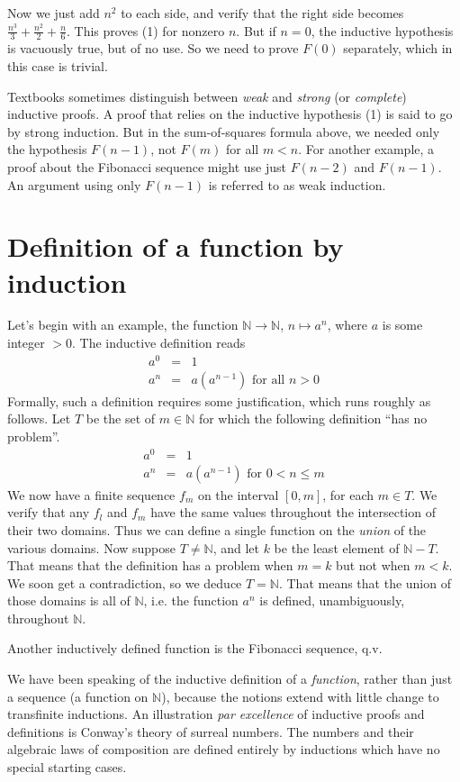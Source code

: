 \documentclass[12pt]{article}
\begin{document}
Now we just add $n^2$ to each side, and verify that the right side becomes
$\frac{n^3}{3} + \frac{n^2}{2} + \frac{n}{6}$.
This proves (1) for nonzero $n$.
But if $n=0$, the inductive hypothesis is vacuously true, but of no use.
So we need to prove $F(0)$ separately, which in this case is trivial.

Textbooks sometimes distinguish between \emph{weak} and
\emph{strong} (or \emph{complete}) inductive proofs.
A proof that relies on the inductive hypothesis (1) is said to go
by strong induction. But in the sum-of-squares formula above,
we needed only the hypothesis $F(n-1)$, not $F(m)$ for all $m<n$.
For another example, a proof about the Fibonacci sequence might
use just $F(n-2)$ and $F(n-1)$.
An argument using only $F(n-1)$ is referred to as weak induction.

\section{Definition of a function by induction}
Let's begin with an example, the function $\mathbb{N}\to\mathbb{N}$,
$n\mapsto a^n$, where $a$ is some integer $>0$.
The inductive definition reads
\begin{eqnarray*}
a^0 & = & 1 \\
a^n & = & a(a^{n-1}) \textrm{ for all }n>0
\end{eqnarray*}
Formally, such a definition requires some justification, which runs roughly
as follows.
Let $T$ be the set of $m\in \mathbb{N}$ for which the following
definition ``has no problem''.
\begin{eqnarray*}
a^0 & = & 1 \\
a^n & = & a(a^{n-1}) \textrm{ for }0<n\le m
\end{eqnarray*}
We now have a finite sequence $f_m$ on the interval $[0,m]$, for
each $m\in T$.
We verify that any $f_l$ and $f_m$ have the same values
throughout the intersection of their two domains.
Thus we can define a single function on the \emph{union} of the
various domains.
Now suppose $T\ne\mathbb{N}$, and let $k$ be the least element of
$\mathbb{N}-T$.
That means that the definition has a problem when $m=k$
but not when $m<k$.
We soon get a contradiction, so we deduce $T=\mathbb{N}$.
That means that the union of those domains is all of $\mathbb{N}$, i.e.
the function $a^n$ is defined, unambiguously, throughout $\mathbb{N}$.

Another inductively defined function is the Fibonacci sequence, q.v.

We have been speaking of the inductive definition of a \emph{function},
rather than just a sequence (a function on $\mathbb{N}$), because the
notions extend with little change to transfinite inductions.
An illustration \emph{par excellence} of inductive proofs and
definitions is Conway's theory of surreal numbers.
The numbers and their algebraic laws of composition are defined
entirely by inductions which have no special starting cases.
\end{document}
